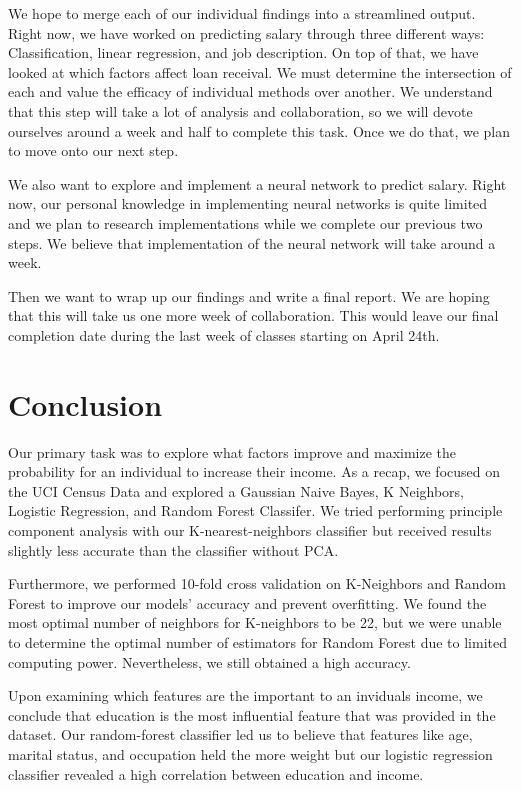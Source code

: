 \documentclass{article}
\begin{document}
We hope to merge each of our individual findings into a streamlined output. Right now, we have worked on predicting salary through three different ways: Classification, linear regression, and job description. On top of that, we have looked at which factors affect loan receival. We must determine the intersection of each and value the efficacy of individual methods over another. We understand that this step will take a lot of analysis and collaboration, so we will devote ourselves around a week and half to complete this task. Once we do that, we plan to move onto our next step. 

We also want to explore and implement a neural network to predict salary. Right now, our personal knowledge in implementing neural networks is quite limited and we plan to research implementations while we complete our previous two steps. We believe that implementation of the neural network will take around a week. 

Then we want to wrap up our findings and write a final report. We are hoping that this will take us one more week of collaboration. This would leave our final completion date during the last week of classes starting on April 24th. 

\section{Conclusion}

Our primary task was to explore what factors improve and maximize the probability for an individual to increase their income. As a recap, we focused on the UCI Census Data and explored a Gaussian Naive Bayes, K Neighbors, Logistic Regression, and Random Forest Classifer. We tried performing principle component analysis with our K-nearest-neighbors classifier but received results slightly less accurate than the classifier without PCA. 

Furthermore, we performed 10-fold cross validation on K-Neighbors and Random Forest to improve our models' accuracy and prevent overfitting. We found the most optimal number of neighbors for K-neighbors to be 22, but we were unable to determine the optimal number of estimators for Random Forest due to limited computing power. Nevertheless, we still obtained a high accuracy. 

Upon examining which features are the important to an inviduals income, we conclude that education is the most influential feature that was provided in the dataset. Our random-forest classifier led us to believe that features like age, marital status, and occupation held the more weight but our logistic regression classifier revealed a high correlation between education and income.
\end{document}
